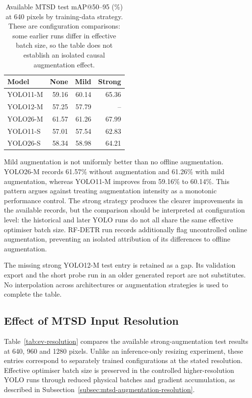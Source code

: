 \begin{table}[htbp]
\centering
\small
\caption{Available \gls{MTSD} test \gls{mAP}@50--95 (\%) at 640 pixels by training-data strategy. These are configuration comparisons: some earlier runs differ in effective batch size, so the table does not establish an isolated causal augmentation effect.}
\label{tab:ev-augmentation}
\renewcommand{\arraystretch}{1.15}
\begin{tabularx}{\textwidth}{@{}>{\raggedright\arraybackslash}Xrrr@{}}
\toprule
Model & None & Mild & Strong \\
\midrule
YOLO11-M & 59.16 & 60.14 & 65.36 \\
YOLO12-M & 57.25 & 57.79 & -- \\
YOLO26-M & 61.57 & 61.26 & 67.99 \\
YOLO11-S & 57.01 & 57.54 & 62.83 \\
YOLO26-S & 58.34 & 58.98 & 64.21 \\
\bottomrule
\end{tabularx}
\end{table}


Mild augmentation is not uniformly better than no offline augmentation. YOLO26-M records 61.57\% without augmentation and 61.26\% with mild augmentation, whereas YOLO11-M improves from 59.16\% to 60.14\%. This pattern argues against treating augmentation intensity as a monotonic performance control. The strong strategy produces the clearer improvements in the available records, but the comparison should be interpreted at configuration level: the historical and later YOLO runs do not all share the same effective optimiser batch size. RF-DETR run records additionally flag uncontrolled online augmentation, preventing an isolated attribution of its differences to offline augmentation.

The missing strong YOLO12-M test entry is retained as a gap. Its validation export and the short probe run in an older generated report are not substitutes. No interpolation across architectures or augmentation strategies is used to complete the table.

\subsection{Effect of MTSD Input Resolution}
\label{sec:ev-resolution}
Table~\ref{tab:ev-resolution} compares the available strong-augmentation test results at 640, 960 and 1280 pixels. Unlike an inference-only resizing experiment, these entries correspond to separately trained configurations at the stated resolution. Effective optimiser batch size is preserved in the controlled higher-resolution YOLO runs through reduced physical batches and gradient accumulation, as described in Subsection~\ref{subsec:mtsd-augmentation-resolution}.

